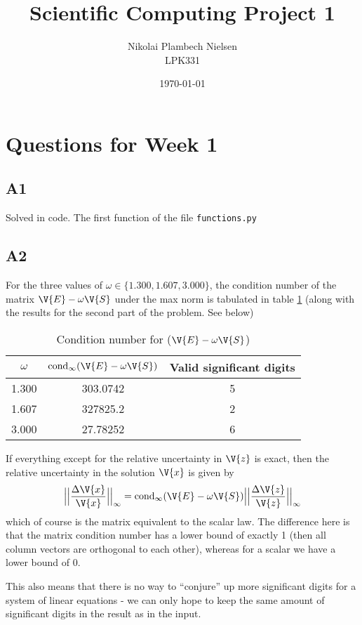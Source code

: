 \documentclass[a4paper,10pt]{article}
\title{Scientific Computing Project 1}
\author{Nikolai Plambech Nielsen\\LPK331}
\date{\today}
\begin{document}
	\maketitle
	\section{Questions for Week 1}
	\subsection*{A1}
	Solved in code. The first function of the file \texttt{functions.py}
	
	\subsection*{A2}
	For the three values of $ \omega \in \{1.300, 1.607, 3.000\} $, the condition number of the matrix $ \V{E}-\omega \V{S} $ under the max norm is tabulated in table \ref{tab:condition} (along with the results for the second part of the problem. See below)
	\begin{table}[H]
		\centering
		\begin{tabular}{c|c|c}
			$ \omega $ & $\text{cond}_{\infty}(\V{E}-\omega \V{S})$ & Valid significant digits\\
			\hline
			1.300 & 303.0742 & 5\\
			1.607 & 327825.2 & 2\\
			3.000 & 27.78252 & 6
		\end{tabular}
		\caption{Condition number for ($ \V{E}-\omega \V{S} $)}
		\label{tab:condition}
	\end{table}
	If everything except for the relative uncertainty in $ \V{z} $ is exact, then the relative uncertainty in the solution $ \V{x} $ is given by
	\begin{equation}\label{eq:cond}
		\Big|\Big|\frac{\Delta \V{x}}{\V{x}}\Big|\Big|_{\infty} = \text{cond}_{\infty} (\V{E}-\omega\V{S}) \Big|\Big|\frac{\Delta \V{z}}{\V{z}}\Big|\Big|_{\infty}
	\end{equation}
	which of course is the matrix equivalent to the scalar law. The difference here is that the matrix condition number has a lower bound of exactly 1 (then all column vectors are orthogonal to each other), whereas for a scalar we have a lower bound of 0.
	
	This also means that there is no way to ``conjure'' up more significant digits for a system of linear equations - we can only hope to keep the same amount of significant digits in the result as in the input.
	
\end{document}
